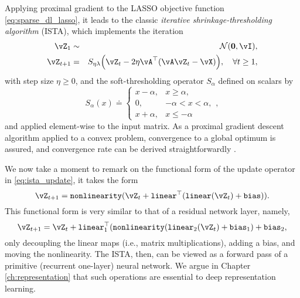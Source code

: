 \documentclass[\toplevelprefix/book-main.tex]{subfiles}
\begin{document}
Applying proximal gradient to the LASSO objective function \eqref{eq:sparse_dl_lasso}, it leads to the classic \textit{iterative shrinkage-thresholding algorithm} (ISTA), which implements the iteration
\begin{eqnarray}
    \vZ_{1} &\sim& \dNorm(\vzero, \vI), \\
    \vZ_{t + 1} &=& S_{\eta\lambda}\rp{\vZ_{t} - 2\eta \vA^{\top}(\vA\vZ_{t} - \vX)}, \quad \forall t \geq 1,\label{eq:ista_update}
\end{eqnarray}
with step size \(\eta \geq 0\), and the soft-thresholding operator \(S_{\alpha}\) defined on scalars by
\begin{equation}
    S_{\alpha}(x) \doteq \begin{cases}x - \alpha, & x \geq \alpha, \\ 0, & -\alpha < x < \alpha, \\ x + \alpha, & x \leq -\alpha\end{cases},
\end{equation}
and applied element-wise to the input matrix.  As a proximal gradient descent algorithm applied to a convex problem, convergence to a global optimum is assured, and convergence rate can be derived straightforwardly \cite{Wright-Ma-2022}. 

We now take a moment to remark on the functional form of the update operator in \eqref{eq:ista_update}, it takes the form 
\begin{equation}
    \vZ_{t + 1} = \texttt{nonlinearity}(\vZ_{t} + \texttt{linear}^{\top}(\texttt{linear}(\vZ_{t}) + \texttt{bias})).
\end{equation}
This functional form is very similar to that of a residual network layer, namely,
\begin{equation}
    \vZ_{t + 1} = \vZ_{t} + \texttt{linear}_{1}^{\top}(\texttt{nonlinearity}(\texttt{linear}_{2}(\vZ_{t}) + \texttt{bias}_{1}) + \texttt{bias}_{2},
\end{equation}
only decoupling the linear maps (i.e., matrix multiplications), adding a bias, and moving the nonlinearity. The ISTA, then, can be viewed as a forward pass of a primitive (recurrent one-layer) neural network. We argue in Chapter \ref{ch:representation} that such operations are essential to deep representation learning.


\end{document}
